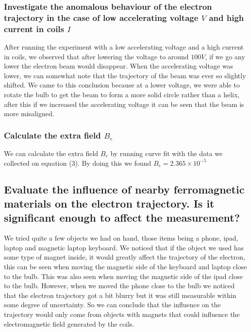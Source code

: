 \documentclass{article}
\begin{document}
\subsubsection*{Investigate the anomalous behaviour of the electron trajectory
in the case of low accelerating voltage $V$ and high current in coils $I$}
After running the experiment with a low accelerating voltage and a high current
in coils, we observed that after lowering the voltage to around $100V$, if we go
any lower the electron beam would disappear. When the accelerating voltage was
lower, we can somewhat note that the trajectory of the beam was ever so slightly
shifted. We came to this conclusion because at a lower voltage, we were able to
rotate the bulb to get the beam to form a more solid circle rather than a helix,
after this if we increased the accelerating voltage it can be seen that the
beam is more misaligned.
\subsubsection*{Calculate the extra field $B_e$}
We can calculate the extra field $B_e$ by running curve fit with the data we
collected on equation (3). By doing this we found $B_e = 2.365\times10^{-5}$

\subsection*{Evaluate the influence of nearby ferromagnetic materials on the
electron trajectory. Is it significant enough to affect the measurement?}
We tried quite a few objects we had on hand, those items being a phone, ipad,
laptop and magnetic laptop keyboard. We noticed that if the object we used has
some type of magnet inside, it would greatly affect the trajectory of the electron,
this can be seen when moving the magnetic side of the keyboard and laptop close
to the bulb. This was also seen when moving the magnetic side of the ipad close
to the bulb. However, when we moved the phone close to the bulb we noticed that
the electron trajectory got a bit blurry but it was still measurable within some
degree of uncertainty. So we can conclude that the influence on the trajectory
would only come from objects with magnets that could influence the electromagnetic
field generated by the coils.

\newpage
\end{document}
